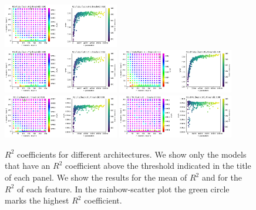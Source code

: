 \documentclass[prd,aps,twocolumn,a4paper,showkeys,nofootinbib]{article}
\begin{document}
\begin{figure}[]
  \hspace{0.3cm}
  \includegraphics[width=0.45\textwidth]{./Figs/crossval_v0c0_R2s2y.png} \\
  \includegraphics[width=0.45\textwidth]{./Figs/crossval_v0c0_R2s2z.png} 
  \hspace{0.3cm}
  \includegraphics[width=0.45\textwidth]{./Figs/crossval_v0c0_R2theta.png} \\
  \includegraphics[width=0.45\textwidth]{./Figs/crossval_v0c0_R2q.png} 
  \hspace{0.3cm}
  \includegraphics[width=0.45\textwidth]{./Figs/crossval_v0c0_R2Mc.png} 
  \caption{\label{fig:crossval_v0c0} $R^2$ coefficients for different architectures. 
  We show only the models that have an $R^2$ coefficient
  above the threshold indicated in the title of each panel. We show the results
  for the mean of $R^2$ and for the $R^2$ of each feature. In the rainbow-scatter plot
  the green circle marks the highest $R^2$ coefficient. }
\end{figure}
%

\clearpage
\end{document}
